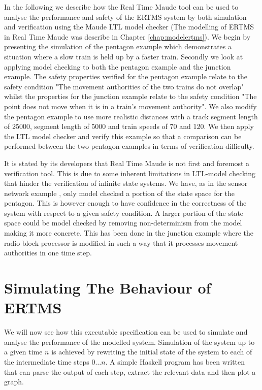 \label{chapter:verifyertms}\label{chap:verifyertms}

In the following we describe how the Real Time Maude tool can be used to analyse the performance and safety of the ERTMS system by both simulation and verification using the Maude LTL model checker (The modelling of ERTMS in Real Time Maude was describe in Chapter \ref{chap:modelertms}).  We begin by presenting the simulation of the pentagon example which demonstrates a situation where a slow train is held up by a faster train. Secondly we look at applying model checking to both the pentagon example and the junction example. The safety properties verified for the pentagon example relate to the safety condition "The movement authorities of the two trains do not overlap" whilst the properties for the junction example relate to the safety condition "The point does not move when it is in a train's movement authority". We also modify the pentagon example to use more realistic distances with a track segment length of 25000, segment length of 5000 and train speeds of 70 and 120.  We then apply the LTL model checker and verify this example so that a comparison can be performed between the two pentagon examples in terms of verification difficulty.

It is stated by its developers that Real Time Maude is not first and foremost a verification tool. This is due to some inherent limitations in LTL-model checking that hinder the verification of infinite state systems. We have, as in the sensor network example \cite{PO07}, only model checked a portion of the state space for the pentagon. This is however enough to have confidence in the correctness of the system with respect to a given safety condition. A larger portion of the state space could be model checked by removing non-determinism from the model making it more concrete. This has been done in the junction example where the radio block processor is modified in such a way that it processes movement authorities in one time step.


\section{Simulating The Behaviour of ERTMS}

We will now see how this executable specification can be used to simulate and analyse the performance of the modelled system. Simulation of the system up to a given time $n$ is achieved by rewriting the initial state of the system to each of the intermediate time steps $0 \ldots n$. A simple Haskell program has been written that can parse the output of each step, extract the relevant data and then plot a graph.


